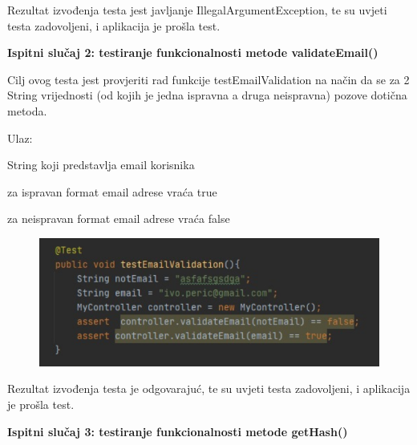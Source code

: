 			Rezultat izvođenja testa jest javljanje IllegalArgumentException, te su uvjeti testa zadovoljeni, i aplikacija je prošla test.
			
		\pagebreak
			
		\textbf{Ispitni slučaj 2: testiranje funkcionalnosti metode validateEmail() }
			
			Cilj ovog testa jest provjeriti rad funkcije testEmailValidation na način da se za 2 String vrijednosti (od kojih je jedna ispravna a druga neispravna) pozove dotična metoda.
		    \vspace{3mm} %
		    
			Ulaz:
			\begin{packed_enum}
			    \item String koji predstavlja email korisnika
			\end{packed_enum}
			
			\noindent
			\begin{packed_enum}
			    \item za ispravan format email adrese vraća true
			    \item za neispravan format email adrese vraća false

			\end{packed_enum}
			
			\begin{figure}[H]
            \includegraphics[scale=1]{dokumentacija/slike/testMail.PNG} %
            \centering
            \label{fig:promjene}
            \end{figure}
			
			Rezultat izvođenja testa je odgovarajuć, te su uvjeti testa zadovoljeni, i aplikacija je prošla test.
		
		  \vspace{10mm} %
		
		\textbf{Ispitni slučaj 3: testiranje funkcionalnosti metode getHash() }
			
